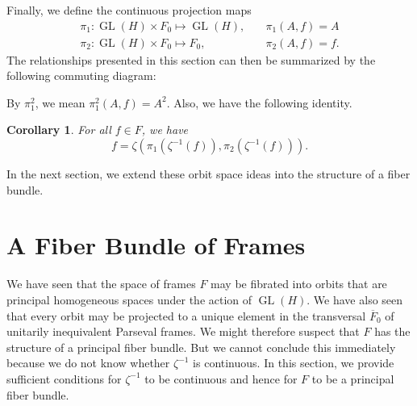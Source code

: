 \documentclass{article}
\newtheorem{cor}[defn]{Corollary}
\newcommand{\GL}{\operatorname{GL}}
\newcommand{\Fbar}{\overline{F}}
\begin{document}
Finally, we define the continuous projection maps
\begin{align*}
\pi_1:\GL(H)\times F_0\mapsto \GL(H), \quad
&\pi_1(A, f) = A \\
\pi_2:\GL(H)\times F_0\mapsto F_0, \quad
&\pi_2(A, f) = f.
\end{align*}
The relationships presented in this section can then be summarized by the following commuting diagram:

\begin{center}
\end{center}

\noindent By $\pi_1^2$, we mean $\pi_1^2(A, f) = A^2$. Also, we have the following identity.
\begin{cor} \label{Identity}
For all $f\in F$, we have
\[ f = \zeta(\pi_1(\zeta^{-1}(f)), \pi_2(\zeta^{-1}(f))). \]
\end{cor}
\noindent In the next section, we extend these orbit space ideas into the structure of a fiber bundle. 


\section{A Fiber Bundle of Frames}

We have seen that the space of frames $F$ may be fibrated into orbits that are principal homogeneous spaces under the action of $\GL(H)$. We have also seen that every orbit may be projected to a unique element in the transversal $\Fbar_0$ of unitarily inequivalent Parseval frames. We might therefore suspect that $F$ has the structure of a principal fiber bundle. But we cannot conclude this immediately because we do not know whether $\zeta^{-1}$ is continuous. In this section, we provide sufficient conditions for $\zeta^{-1}$ to be continuous and hence for $F$ to be a principal fiber bundle.
\end{document}

